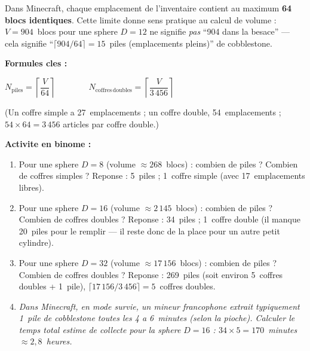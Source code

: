 \documentclass[12pt,a4paper]{scrartcl}
\newcommand{\acc}[1]{\textcolor{accent}{\textbf{#1}}}
\newcommand{\tempo}[1]{\textnormal{\footnotesize\color{bg!90!white}\textsf{#1}}}
\begin{document}
\begin{activite}[4.1 --- Arithmetique des piles \quad\tempo{15 min}]\label{at:41}
Dans Minecraft, chaque emplacement de l'inventaire contient au maximum \acc{64 blocs identiques}. Cette limite donne sens pratique au calcul de volume : $V = 904$~blocs pour une sphere $D=12$ ne signifie \emph{pas} \enquote{904 dans la besace} --- cela signifie \enquote{$\lceil 904/64 \rceil = 15$~piles (emplacements pleins)} de cobblestone.

\textbf{Formules cles :}

\begin{formule}
\centering
$\displaystyle N_{\mathrm{piles}} = \left\lceil \dfrac{V}{64} \right\rceil
\qquad\qquad
N_{\mathrm{coffres\,doubles}} = \left\lceil \dfrac{V}{3\,456} \right\rceil$
\end{formule}

(Un coffre simple a 27~emplacements ; un coffre double, 54~emplacements ; $54 \times 64 = 3\,456$ articles par coffre double.)

\textbf{Activite en binome :}
\begin{enumerate}[leftmargin=1.5em,itemsep=0.15em,topsep=0.3em,nosep]
  \item Pour une sphere $D = 8$ (volume $\approx 268$~blocs) : combien de piles ? Combien de coffres simples ? Reponse : 5~piles ; 1~coffre simple (avec 17~emplacements libres).
  \item Pour une sphere $D = 16$ (volume $\approx 2\,145$~blocs) : combien de piles ? Combien de coffres doubles ? Reponse : 34~piles ; 1~coffre double (il manque 20~piles pour le remplir --- il reste donc de la place pour un autre petit cylindre).
  \item Pour une sphere $D = 32$ (volume $\approx 17\,156$~blocs) : combien de piles ? Combien de coffres doubles ? Reponse : 269~piles (soit environ 5~coffres doubles + 1~pile), $\lceil 17\,156/3\,456 \rceil = 5$~coffres doubles.
  \item \emph{Dans Minecraft, en mode survie, un mineur francophone extrait typiquement 1~pile de cobblestone toutes les 4 a 6~minutes (selon la pioche). Calculer le temps total estime de collecte pour la sphere $D = 16$ : $34 \times 5 = 170$~minutes $\approx 2{,}8$~heures.}
\end{enumerate}
\end{activite}
\end{document}
